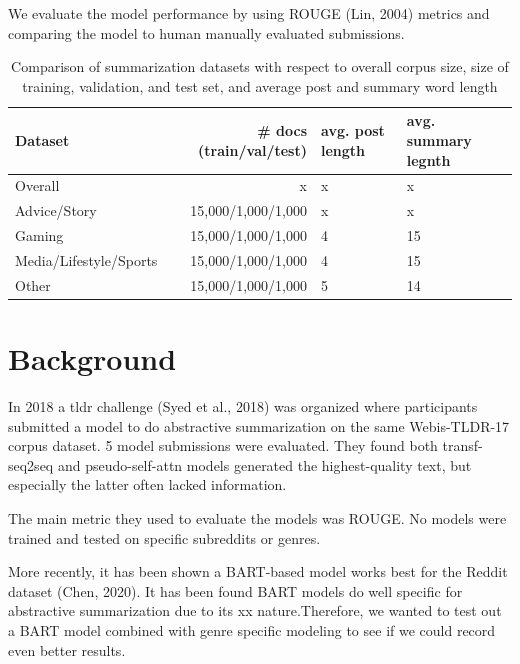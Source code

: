 \documentclass[11pt,a4paper, twocolumn]{article}
\begin{document}
We evaluate the model performance by using ROUGE (Lin, 2004) metrics and comparing the model to human manually evaluated submissions.

\begin{table}
\centering
\begin{tabular}{lrll}
\hline \textbf{Dataset} & \textbf{# docs (train/val/test)} & \textbf{avg. post length} & \textbf{avg. summary legnth} \\ \hline
Overall & x & x & x \\
Advice/Story & 15,000/1,000/1,000 & x & x \\
Gaming & 15,000/1,000/1,000 & 4 & 15 \\
Media/Lifestyle/Sports & 15,000/1,000/1,000 & 4 & 15 \\
Other & 15,000/1,000/1,000 & 5 & 14 \\
\hline
\end{tabular}
\caption{\label{font-table} Comparison of summarization datasets with respect to overall corpus size, size of training, validation, and
test set, and average post and summary word length}
\end{table}

\section{Background}
\label{sec:length}

In 2018 a tldr challenge (Syed et al., 2018) was organized where participants submitted a model to do abstractive summarization on the same Webis-TLDR-17 corpus dataset. 5 model submissions were evaluated. They found both transf-seq2seq and pseudo-self-attn models generated the highest-quality text, but especially the latter often lacked information.

The main metric they used to evaluate the models was ROUGE. No models were trained and tested on specific subreddits or genres.

More recently, it has been shown a BART-based model works best for the Reddit dataset (Chen, 2020). It has been found BART models do well specific for abstractive summarization due to its xx nature.Therefore, we wanted to test out a BART model combined with genre specific modeling to see if we could record even better results.


\\
\end{document}
